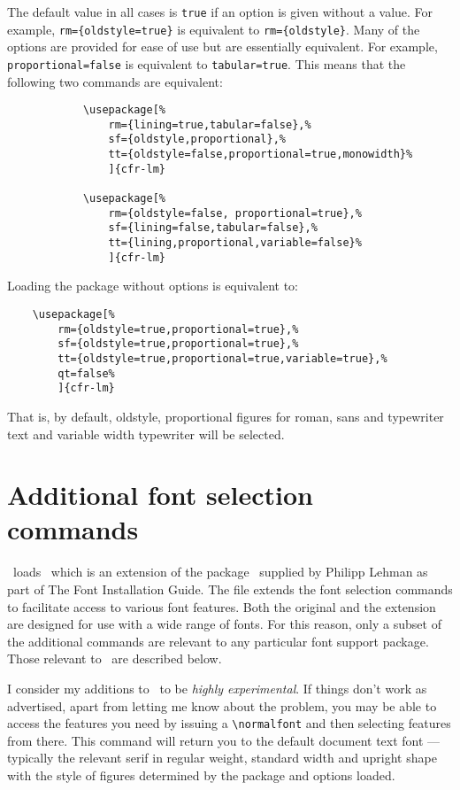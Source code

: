\documentclass[11pt,british,a4paper]{article}
\begin{document}
The default value in all cases is \verb|true| if an option is given without a value. For example, \verb|rm={oldstyle=true}| is equivalent to \verb|rm={oldstyle}|. Many of the options are provided for ease of use but are essentially equivalent. For example, \verb|proportional=false| is equivalent to \verb|tabular=true|. This means that the following two commands are equivalent:
		\begin{verbatim}
			\usepackage[%
				rm={lining=true,tabular=false},%
				sf={oldstyle,proportional},%
				tt={oldstyle=false,proportional=true,monowidth}%
				]{cfr-lm}

			\usepackage[%
				rm={oldstyle=false, proportional=true},%
				sf={lining=false,tabular=false},%
				tt={lining,proportional,variable=false}%
				]{cfr-lm}
		\end{verbatim}

Loading the package without options is equivalent to:
\begin{verbatim}
	\usepackage[%
		rm={oldstyle=true,proportional=true},%
		sf={oldstyle=true,proportional=true},%
		tt={oldstyle=true,proportional=true,variable=true},%
		qt=false%
		]{cfr-lm}
\end{verbatim}
That is, by default, oldstyle, proportional figures for roman, sans and typewriter text and variable width typewriter will be selected.

\section{Additional font selection commands}\label{sec:commands}

\ loads \ which is an extension of the package \ supplied by Philipp Lehman as part of The Font Installation Guide. The file extends the font selection commands to facilitate access to various font features. Both the original and the extension are designed for use with a wide range of fonts. For this reason, only a subset of the additional commands are relevant to any particular font support package. Those relevant to \ are described below.

I consider my additions to \ to be \emph{highly experimental}. If things don't work as advertised, apart from letting me know about the problem, you may be able to access the features you need by issuing a \verb|\normalfont| and then selecting features from there. This command will return you to the default document text font --- typically the relevant serif in regular weight, standard width and upright shape with the style of figures determined by the package and options loaded.
\end{document}
